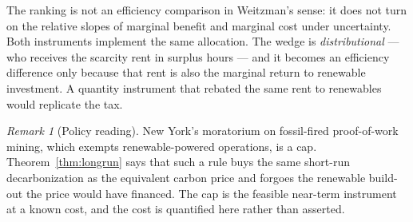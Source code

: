 \documentclass[11pt,reqno]{amsart}
\theoremstyle{plain}\newtheorem{theorem}{Theorem}\newtheorem{proposition}[theorem]{Proposition}
\theoremstyle{definition}\newtheorem{definition}[theorem]{Definition}
\theoremstyle{remark}\newtheorem{remark}[theorem]{Remark}
\begin{document}
\begin{corollary}
The ranking is not an efficiency comparison in Weitzman's sense: it does not turn on the
relative slopes of marginal benefit and marginal cost under uncertainty. Both instruments
implement the same allocation. The wedge is \emph{distributional} --- who receives the
scarcity rent in surplus hours --- and it becomes an efficiency difference only because that
rent is also the marginal return to renewable investment. A quantity instrument that
rebated the same rent to renewables would replicate the tax.
\end{corollary}

\begin{remark}[Policy reading]
New York's moratorium on fossil-fired proof-of-work mining, which exempts renewable-powered
operations, is a cap. Theorem~\ref{thm:longrun} says that such a rule buys the same
short-run decarbonization as the equivalent carbon price and forgoes the renewable
build-out the price would have financed. The cap is the feasible near-term instrument at a
known cost, and the cost is quantified here rather than asserted.
\end{remark}
\end{document}
